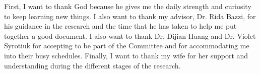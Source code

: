 \begin{acknowledgements}
   First, I want to thank God because he gives me the daily strength and curiosity to keep learning new things. I also want to thank my advisor, Dr. Rida Bazzi, for his guidance in the research and the time that he has taken to help me put together a good document.  I also want to thank Dr. Dijian Huang and Dr. Violet Syrotiuk for accepting to be part of the Committee and for accommodating me into their busy schedules. Finally, I want to thank my wife for her support and understanding during the different stages of the research.
\end{acknowledgements}